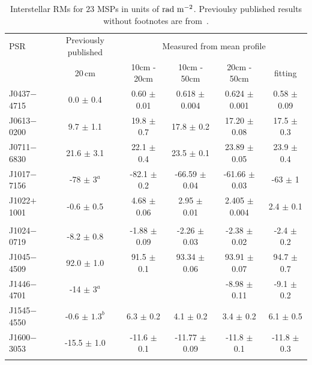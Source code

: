 \documentclass[useAMS,usenatbib]{mn2e}
\begin{document}
\begin{table}
\centering
\caption{Interstellar RMs for $23$ MSPs in units of $\rm{rad\ m^{-2}}$. Previoulsy published results without footnotes are from~\citet{Yan11}.}
\label{rm}
\begin{tabular}{lccccc}
\hline
PSR          &    Previously published     &    \multicolumn{4}{c}{Measured from mean profile}       \\  
             &    20\,cm                   &    10cm - 20cm  &  10cm - 50cm   &  20cm - 50cm   &    fitting      \\   
\hline
J0437$-$4715 & 0.0    $\pm$ 0.4      & 0.60   $\pm$ 0.01  & 0.618   $\pm$ 0.004 &  0.624   $\pm$ 0.001 &  0.58   $\pm$ 0.09   \\  
J0613$-$0200 & 9.7    $\pm$ 1.1      & 19.8   $\pm$ 0.7   & 17.8    $\pm$ 0.2   &  17.20   $\pm$ 0.08  &  17.5   $\pm$ 0.3   \\  
J0711$-$6830 & 21.6   $\pm$ 3.1      & 22.1   $\pm$ 0.4   & 23.5    $\pm$ 0.1   &  23.89   $\pm$ 0.05  &  23.9   $\pm$ 0.4   \\  
J1017$-$7156 & -78    $\pm$ $3^a$    & -82.1  $\pm$ 0.2   & -66.59  $\pm$ 0.04  &  -61.66  $\pm$ 0.03  &  -63    $\pm$ 1    \\
J1022$+$1001 & -0.6   $\pm$ 0.5      & 4.68   $\pm$ 0.06  & 2.95    $\pm$ 0.01  &  2.405   $\pm$ 0.004 &  2.4    $\pm$ 0.1   \\  
             &                       &                    &                     &                      &                     \\
J1024$-$0719 & -8.2   $\pm$ 0.8      & -1.88  $\pm$ 0.09  & -2.26   $\pm$ 0.03  &  -2.38   $\pm$ 0.02  &  -2.4   $\pm$ 0.2    \\  
J1045$-$4509 & 92.0   $\pm$ 1.0      & 91.5   $\pm$ 0.1   & 93.34   $\pm$ 0.06  &  93.91   $\pm$ 0.07  &  94.7   $\pm$ 0.7    \\  
J1446$-$4701 & -14    $\pm$ $3^a$    &                    &                     &  -8.98   $\pm$ 0.11  &  -9.1   $\pm$ 0.2    \\
J1545$-$4550 & -0.6   $\pm$ $1.3^b$  & 6.3    $\pm$ 0.2   & 4.1     $\pm$ 0.2   &  3.4     $\pm$ 0.2   &  6.1    $\pm$ 0.5    \\
J1600$-$3053 & -15.5  $\pm$ 1.0      & -11.6  $\pm$ 0.1   & -11.77  $\pm$ 0.09  &  -11.8   $\pm$ 0.1   &  -11.8  $\pm$ 0.3    \\  
             &                       &                    &                     &                      &                      \\

\end{tabular}
\end{table}
\end{document}
